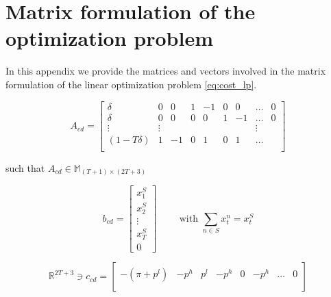 \documentclass[sigconf, table]{acmart}
\newcommand{\pricelow}{p^l}
\newcommand{\pricehigh}{p^h}
\newcommand{\ramp}{\delta}
\newcommand{\cons}{x}
\newcommand{\ccd}{c_{cd}}
\newcommand{\acd}{A_{cd}}
\newcommand{\bcd}{b_{cd}}
\begin{document}



\appendix


\section{Matrix formulation of the optimization problem}\label{ap:matrix}

In this appendix we provide the matrices and vectors involved in the matrix formulation of the linear optimization problem \eqref{eq:cost_lp}.

\begin{equation}
  \acd = \begin{bmatrix} 
    \delta & 0 & 0 & 1 & - 1 & 0 & 0 & \dots & 0 \\
    \delta & 0 & 0 & 0 & 0 & 1 & -1 & \dots & 0 \\
    \vdots & \vdots & &&&&& \vdots\\
    (1 - T\ramp) & 1 & -1 & 0 & 1 & 0 & 1 & \dots  \\ 
    \end{bmatrix}
\end{equation}

such that $\acd \in \mathbb{M}_{(T+1)\times (2T + 3)}$

\begin{equation}
    \bcd = \begin{bmatrix}
    x^S_1 \\
    x^S_2 \\
    \vdots \\
    x^S_{T} \\
    0
    \end{bmatrix}
    \qquad 
    \text{ with }\sum_{n \in S} \cons^n_t = \cons^S_t
\end{equation}


\begin{equation}
    \mathbb{R}^{2T + 3} \ni \ccd = \begin{bmatrix}
    -(\pi + \pricelow) & -\pricehigh & \pricelow &  -\pricehigh & 0 & -\pricehigh & \dots & 0\\ 
    \end{bmatrix}
\end{equation}
\end{document}
